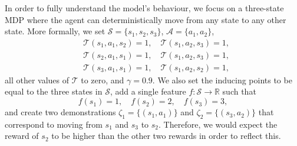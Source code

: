 \documentclass{mpaper}
\begin{document}
In order to fully understand the model's behaviour, we focus on a three-state
MDP where the agent can deterministically move from any state to any other
state. More formally, we set $\mathcal{S} = \{ s_1, s_2, s_3 \}$, $\mathcal{A} =
\{ a_1, a_2 \}$,
\begin{align*}
  &\mathcal{T}(s_1, a_1, s_2) = 1, \quad \mathcal{T}(s_1, a_2, s_3) = 1, \\
  &\mathcal{T}(s_2, a_1, s_1) = 1, \quad \mathcal{T}(s_1, a_2, s_3) = 1, \\
  &\mathcal{T}(s_3, a_1, s_1) = 1, \quad \mathcal{T}(s_1, a_2, s_2) = 1,
\end{align*}
all other values of $\mathcal{T}$ to zero, and $\gamma = 0.9$. We
also set the inducing points to be equal to the three states in $\mathcal{S}$,
add a single feature $f : \mathcal{S} \to \mathbb{R}$ such that
\[
  f(s_1) = 1, \quad f(s_2) = 2, \quad f(s_3) = 3,
\]
and create two demonstrations $\zeta_1 = \{ (s_1, a_1) \}$ and $\zeta_2 = \{
(s_3, a_2) \}$ that correspond to moving from $s_1$ and $s_3$ to $s_2$.
Therefore, we would expect the reward of $s_2$ to be higher than the other two
rewards in order to reflect this.
\end{document}
